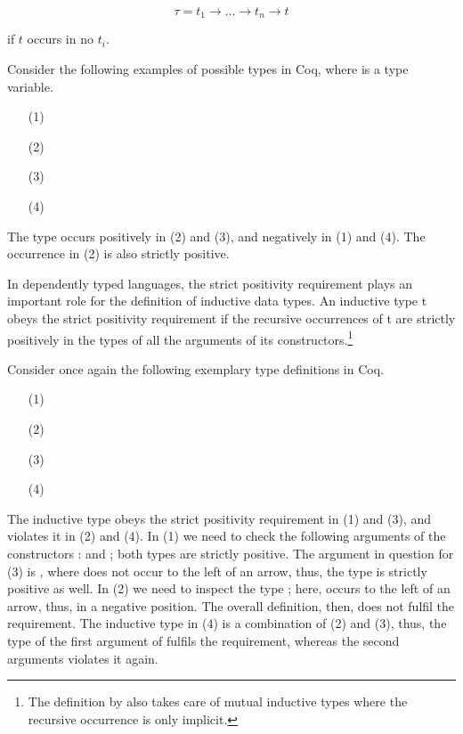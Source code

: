 \begin{excursus}
\[
\tau = t_1 \rightarrow \dots \rightarrow t_n \rightarrow t
\]

if $t$ occurs in no $t_i$.

Consider the following examples of possible types in Coq, where
 is a type variable.

\begin{enumerate}
\item[(1)] 
\item[(2)] 
\item[(3)] 
\item[(4)] 
\end{enumerate}

The type  occurs positively in (2) and (3), and negatively in
(1) and (4).
The occurrence in (2) is also strictly positive.

In dependently typed languages, the strict positivity
requirement plays an important role for the definition of inductive
data types.
An inductive type t obeys the strict positivity requirement if the
recursive occurrences of t are strictly positively in the types of all
the arguments of its constructors.\footnote{The definition by
  \citeauthor{blanqui2002inductivedatatype} also takes care of mutual
  inductive types where the recursive occurrence is only implicit.}

Consider once again the following exemplary type definitions in Coq.

\begin{enumerate}
\item[(1)] 
\item[(2)] 
\item[(3)] 
\item[(4)] 
\end{enumerate}

The inductive type  obeys the strict positivity requirement in
(1) and (3), and violates it in (2) and (4).
In (1) we need to check the following arguments of the constructors
:  and ; both types are strictly positive.
The argument in question for (3) is , where 
does not occur to the left of an arrow, thus, the type is strictly
positive as well.
In (2) we need to inspect the type ; here, 
occurs to the left of an arrow, thus, in a negative position.
The overall definition, then, does not fulfil the requirement.
The inductive type in (4) is a combination of (2) and (3), thus, the
type of the first argument of  fulfils the requirement,
whereas the second arguments violates it again.
\end{excursus}

